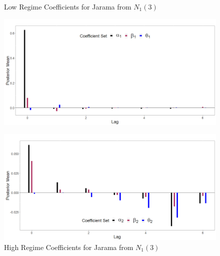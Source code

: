 \begin{figure}[!h]
\center
\begin{minipage}[h]{0.8\textwidth}
\caption{Low Regime Coefficients for Jarama from $N_1(3)$}
\label{fig:jar3}
\includegraphics[scale=0.29]{JaramaL3}
\end{minipage} \hspace{\textwidth}
\begin{minipage}[h]{0.8\textwidth}
\caption{High Regime Coefficients for Jarama from $N_1(3)$}
\label{fig:jar4}
\includegraphics[scale=0.29]{JaramaH3}
\end{minipage}
\end{figure}

